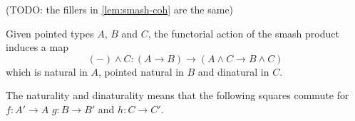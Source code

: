 \documentclass{article}
\newcommand{\pmap}{\to}
\newcommand{\smsh}{\wedge}
\begin{document}
\begin{lem}
	(TODO: the fillers in \autoref{lem:smash-coh} are the same)
\end{lem}

\begin{thm}\label{thm:smash-functor-right}
Given pointed types $A$, $B$ and $C$, the functorial action of the smash product induces a map
$$({-})\smsh C:(A\pmap B)\pmap(A\smsh C\pmap B\smsh C)$$
which is natural in $A$, pointed natural in $B$ and dinatural in $C$.
\end{thm}
The naturality and dinaturality means that the following squares commute for $f : A' \to A$ $g:B\to B'$ and $h:C\to C'$.
\begin{center}
\qquad
{}
\end{center}
\end{document}
